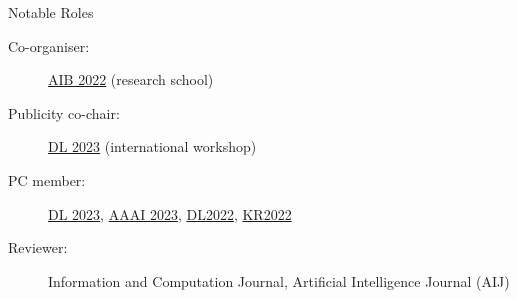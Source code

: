\begin{rSection}{Notable Roles}
    \begin{description}
        \item[Co-organiser:] \href{https://researchschool.w.uib.no/}{AIB 2022} (research school) 
        \item[Publicity co-chair:] \href{https://dl2023.w.uib.no/}{DL 2023} (international workshop)
        \item[PC member:]   \href{https://dl2023.w.uib.no/}{DL 2023}, \href{https://aaai.org/Conferences/AAAI-23/}{AAAI 2023}, \href{http://dl.kr.org/dl2022}{DL2022}, \href{https://kr2022.cs.tu-dortmund.de/}{KR2022}
        \item[Reviewer:] Information and Computation Journal, Artificial Intelligence Journal (AIJ)
    \end{description} 
\end{rSection}
